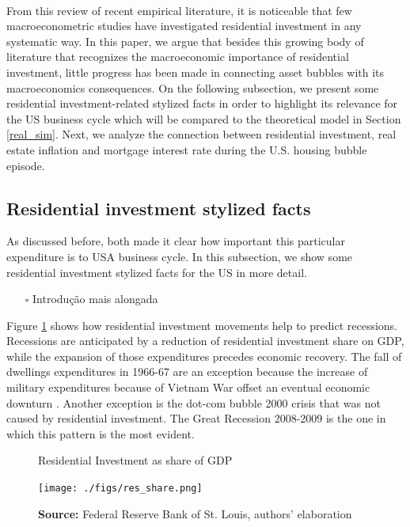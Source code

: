 \documentclass[11pt]{article}
\begin{document}
\\
From this review of recent empirical literature, it is noticeable that few macroeconometric studies have investigated residential investment in any systematic way.
In this paper, we argue that besides this growing body of literature that recognizes the macroeconomic importance of residential investment, little progress has been made in connecting asset bubbles with its macroeconomics consequences.
On the following subsection, we present some residential investment-related stylized facts in order to highlight its relevance for the US business cycle which will be compared to the theoretical model in Section \ref{real_sim}.
Next, we analyze the connection between residential investment, real estate inflation and mortgage interest rate during the U.S. housing bubble episode.

\subsection{Residential investment stylized facts}
\label{sec:orge04fa0f}

As discussed before, both \textcites{green_follow_1997}{leamer_housing_2007} made it clear how important this particular expenditure is to USA business cycle. In this subsection, we show some residential investment stylized facts for the US in more detail.

\begin{itemize}
\item[{$\square$}] Introdução mais alongada
\end{itemize}

Figure \ref{Investo_Resid_GDP} shows how residential investment movements help to predict recessions. Recessions are anticipated by a reduction of residential investment share on GDP, while the expansion of those expenditures precedes economic recovery. The fall of dwellings expenditures in 1966-67 are an exception because the increase of military expenditures because of Vietnam War offset an eventual economic downturn \cite[p.~20]{leamer_housing_2007}. Another exception is the dot-com bubble 2000 crisis that was not caused by residential investment. The Great Recession 2008-2009 is the one in which this pattern is the most evident. 



\begin{figure}[htb]
    \centering
        \caption{Residential Investment as share of GDP}
        \label{Investo_Resid_GDP}
    \texttt{[image: ./figs/res\_share.png]}
    \caption*{\textbf{Source:} Federal Reserve Bank of St. Louis, authors’ elaboration}
\end{figure}
\end{document}
